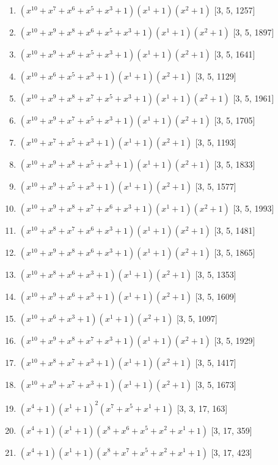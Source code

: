\documentclass[10pt,twocolumn]{article}
\begin{document}
\begin{enumerate}
\item $(x^{10} + x^{7} + x^{6} + x^{5} + x^{3} + 1)(x^{1} + 1)(x^{2} + 1)$  [3, 5, 1257]
\item $(x^{10} + x^{9} + x^{8} + x^{6} + x^{5} + x^{3} + 1)(x^{1} + 1)(x^{2} + 1)$  [3, 5, 1897]
\item $(x^{10} + x^{9} + x^{6} + x^{5} + x^{3} + 1)(x^{1} + 1)(x^{2} + 1)$  [3, 5, 1641]
\item $(x^{10} + x^{6} + x^{5} + x^{3} + 1)(x^{1} + 1)(x^{2} + 1)$  [3, 5, 1129]
\item $(x^{10} + x^{9} + x^{8} + x^{7} + x^{5} + x^{3} + 1)(x^{1} + 1)(x^{2} + 1)$  [3, 5, 1961]
\item $(x^{10} + x^{9} + x^{7} + x^{5} + x^{3} + 1)(x^{1} + 1)(x^{2} + 1)$  [3, 5, 1705]
\item $(x^{10} + x^{7} + x^{5} + x^{3} + 1)(x^{1} + 1)(x^{2} + 1)$  [3, 5, 1193]
\item $(x^{10} + x^{9} + x^{8} + x^{5} + x^{3} + 1)(x^{1} + 1)(x^{2} + 1)$  [3, 5, 1833]
\item $(x^{10} + x^{9} + x^{5} + x^{3} + 1)(x^{1} + 1)(x^{2} + 1)$  [3, 5, 1577]
\item $(x^{10} + x^{9} + x^{8} + x^{7} + x^{6} + x^{3} + 1)(x^{1} + 1)(x^{2} + 1)$  [3, 5, 1993]
\item $(x^{10} + x^{8} + x^{7} + x^{6} + x^{3} + 1)(x^{1} + 1)(x^{2} + 1)$  [3, 5, 1481]
\item $(x^{10} + x^{9} + x^{8} + x^{6} + x^{3} + 1)(x^{1} + 1)(x^{2} + 1)$  [3, 5, 1865]
\item $(x^{10} + x^{8} + x^{6} + x^{3} + 1)(x^{1} + 1)(x^{2} + 1)$  [3, 5, 1353]
\item $(x^{10} + x^{9} + x^{6} + x^{3} + 1)(x^{1} + 1)(x^{2} + 1)$  [3, 5, 1609]
\item $(x^{10} + x^{6} + x^{3} + 1)(x^{1} + 1)(x^{2} + 1)$  [3, 5, 1097]
\item $(x^{10} + x^{9} + x^{8} + x^{7} + x^{3} + 1)(x^{1} + 1)(x^{2} + 1)$  [3, 5, 1929]
\item $(x^{10} + x^{8} + x^{7} + x^{3} + 1)(x^{1} + 1)(x^{2} + 1)$  [3, 5, 1417]
\item $(x^{10} + x^{9} + x^{7} + x^{3} + 1)(x^{1} + 1)(x^{2} + 1)$  [3, 5, 1673]
\item $(x^{4} + 1)(x^{1} + 1)^{2}(x^{7} + x^{5} + x^{1} + 1)$  [3, 3, 17, 163]
\item $(x^{4} + 1)(x^{1} + 1)(x^{8} + x^{6} + x^{5} + x^{2} + x^{1} + 1)$  [3, 17, 359]
\item $(x^{4} + 1)(x^{1} + 1)(x^{8} + x^{7} + x^{5} + x^{2} + x^{1} + 1)$  [3, 17, 423]

\end{enumerate}
\end{document}
